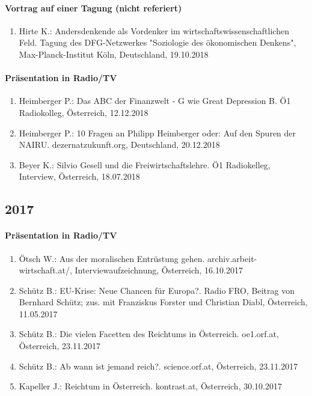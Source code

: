 \paragraph{Vortrag auf einer Tagung (nicht referiert)}
\begin{enumerate}
	\item Hirte K.: Andersdenkende als Vordenker im wirtschaftswissenschaftlichen Feld. Tagung des DFG-Netzwerkes "Soziologie des ökonomischen Denkens", Max-Planck-Institut Köln, Deutschland, 19.10.2018
\end{enumerate}
\paragraph{Präsentation in Radio/TV}
\begin{enumerate}
	\item Heimberger P.: Das ABC der Finanzwelt - G wie Great Depression B. Ö1 Radiokolleg, Österreich, 12.12.2018
	\item Heimberger P.: 10 Fragen an Philipp Heimberger oder: Auf den Spuren der NAIRU. dezernatzukunft.org, Deutschland, 20.12.2018
	\item Beyer K.: Silvio Gesell und die Freiwirtschaftslehre. Ö1 Radiokelleg, Interview, Österreich, 18.07.2018
\end{enumerate}
\subsection*{2017}

    \paragraph{Präsentation in Radio/TV}
\begin{enumerate}
	\item Ötsch W.: Aus der moralischen Entrüstung gehen. archiv.arbeit-wirtschaft.at/, Interviewaufzeichnung, Österreich, 16.10.2017
	\item Schütz B.: EU-Krise: Neue Chancen für Europa?. Radio FRO, Beitrag von Bernhard Schütz; zus. mit Franziskus Forster und Christian Diabl, Österreich, 11.05.2017
	\item Schütz B.: Die vielen Facetten des Reichtums in Österreich. oe1.orf.at, Österreich, 23.11.2017
	\item Schütz B.: Ab wann ist jemand reich?. science.orf.at, Österreich, 23.11.2017
	\item Kapeller J.: Reichtum in Österreich. kontrast.at, Österreich, 30.10.2017
\end{enumerate}
